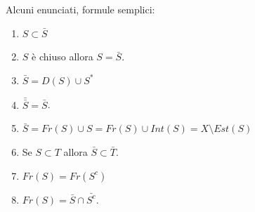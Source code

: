 \begin{proposition}
	Alcuni enunciati, formule semplici:
	\begin{enumerate}
		\item $S \subset \bar{S}$
		\item $S$ è chiuso allora $S = \bar{S}$.
		\item $\bar{S} = D(S) \cup S^*$
		\item $\bar{\bar{S}} = \bar{S}$.
		\item $\bar{S} = Fr(S) \cup S = Fr(S) \cup Int(S) = X \setminus Est(S)$
		\item Se $S \subset  T$ allora $\bar{S} \subset \bar{T}$.
		\item $Fr(S) = Fr(S^c)$
		\item $Fr(S) = \bar{S} \cap \bar{S^c}$.
	\end{enumerate}
\end{proposition}

